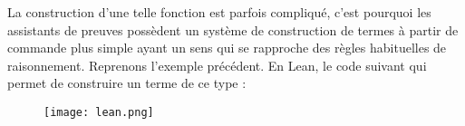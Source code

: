 \documentclass[../../rapport.tex]{subfiles}
\begin{document}
  La construction d'une telle fonction est parfois compliqué, c'est pourquoi les assistants de preuves possèdent
  un système de construction de termes à partir de commande plus simple ayant un sens qui se rapproche des règles habituelles
  de raisonnement.
  Reprenons l'exemple précédent. En Lean, le code suivant qui permet de construire un terme de ce type :
  \begin{figure}[ht]
    \centering
    \texttt{[image: lean.png]}
  \end{figure}
\end{document}
